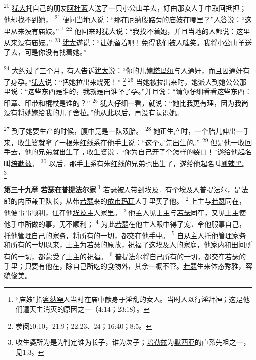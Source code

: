 \textsuperscript{20}
\uline{犹大}托自己的朋友\uline{阿杜蓝}人送了一只小公山羊去，好由那女人手中取回抵押；他却找不到她，
\textsuperscript{21}
便问当地人说：“那在\uline{厄纳殷}路旁的庙妓在哪里？”人答说：“这里从来没有庙妓。”
\footnote{“庙妓”指\uline{客纳罕}人当时在庙中献身于淫乱的女人。当时人以行淫拜神；这是他们遭天主消灭的原因之一（4:14；23:18）。}
\textsuperscript{22}
他回来对\uline{犹大}说：“我找不着她，并且当地的人都说：这里从来没有庙妓。”
\textsuperscript{23}
\uline{犹大}遂说：“让她留着吧！免得我们被人嗤笑。我将小公山羊送了去，可是你没有找着她。”

\textsuperscript{24}
大约过了三个月，有人告诉\uline{犹大}说：“你的儿媳\uline{塔玛尔}与人通奸，而且因通奸有了身孕。”\uline{犹大}说：“把她拉出来烧死！”
\footnote{参阅20:10，21:9；22:23、24；16:40；8:5。}
\textsuperscript{25}
当她被拉出来时，她派人到她公公那里说：“这些东西是谁的，我就是由谁怀了孕。”并且说：“请你仔细看看这些东西：印章、印带和棍杖是谁的？”
\textsuperscript{26}
\uline{犹大}仔细一看，就说：“她比我更有理，因为我尚没有将她嫁给我的儿子\uline{舍拉}。”他从此以后，再没有认识她。

\textsuperscript{27}
到了她要生产的时候，腹中竟是一队双胎。
\textsuperscript{28}
她正生产时，一个胎儿伸出一手来，收生婆就拿了一根朱红线系在他手上说：“这个是先出生的。”
\textsuperscript{29}
但是他一收回手去，他的兄弟就出生了；收生婆说：“你为自己开了个怎样的裂口！”遂给他起名叫\uline{培勒兹}。
\textsuperscript{30}
以后，那手上系有朱红线的兄弟也出生了，遂给他起名叫\uline{则辣黑}。
\footnote{收生婆所为是为判定谁为长子，谁为次子；\uline{培勒兹}为\uline{默西亚}的直系先祖之一，见1:3。}

\textbf{第三十九章 }
\textbf{若瑟在普提法尔家 }
\textsuperscript{1}
\uline{若瑟}被人带到\uline{埃及}，有个\uline{埃及}人\uline{普提法尔}，是法郎的内臣兼卫队长，从带\uline{若瑟}来的\uline{依市玛耳}人手里买了他。
\textsuperscript{2}
上主与\uline{若瑟}同在，他便事事顺利，住在他\uline{埃及}主人家里。
\textsuperscript{3}
他主人见上主与\uline{若瑟}同在，又见上主使他手中所做的事，无不顺利；
\textsuperscript{4}
为此\uline{若瑟}在他主人眼中得了宠，令他服事自己，托他管理自己的家务，将所有的一切，都交在他手中。
\textsuperscript{5}
自从主人托他管理家务和所有的一切以来，上主为\uline{若瑟}的原故，祝福了这\uline{埃及}人的家庭，他家内和田间所有的一切，都蒙受了上主的祝福。
\textsuperscript{6}
\uline{普提法尔}将自己所有的一切，都交在\uline{若瑟}的手里；只要有他在，除自己所吃的食物外，其余一概不管。\uline{若瑟}生来体态秀雅，容貌俊美。

